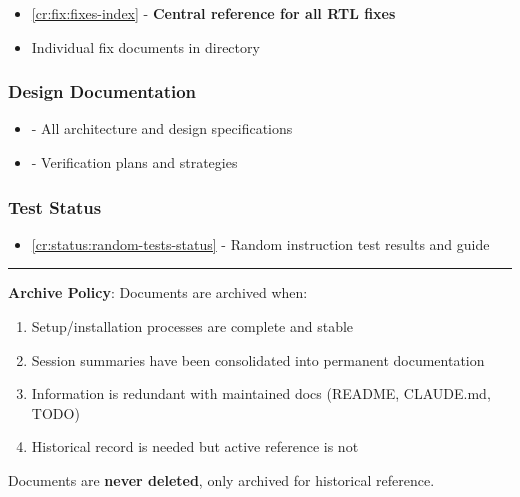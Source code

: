 \begin{record}

\begin{itemize}
\tightlist
\item
  \cref{cr:fix:fixes-index} - \textbf{Central reference for all RTL
  fixes}
\item
  Individual fix documents in  directory
\end{itemize}

\end{record}

\subsubsection{Design Documentation}\label{cr:app:archive-readme:design-documentation}

\begin{record}

\begin{itemize}
\tightlist
\item
   - All architecture and design specifications
\item
   - Verification plans and strategies
\end{itemize}

\end{record}

\subsubsection{Test Status}\label{cr:app:archive-readme:test-status}

\begin{record}

\begin{itemize}
\tightlist
\item
  \cref{cr:status:random-tests-status} - Random instruction test results
  and guide
\end{itemize}

\begin{center}\rule{0.5\linewidth}{0.5pt}\end{center}

\textbf{Archive Policy}: Documents are archived when:

\begin{enumerate}
\def\labelenumi{\arabic{enumi}.}
\tightlist
\item
  Setup/\allowbreak{}installation processes are complete and stable
\item
  Session summaries have been consolidated into permanent documentation
\item
  Information is redundant with maintained docs (README, CLAUDE.md,
  TODO)
\item
  Historical record is needed but active reference is not
\end{enumerate}

Documents are \textbf{never deleted}, only archived for historical
reference.

\end{record}

